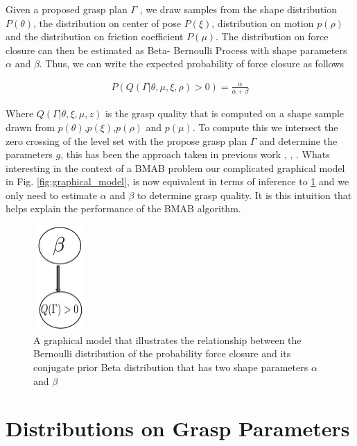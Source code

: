 \documentclass[letterpaper, 10 pt, conference]{ieeeconf}  %
\begin{document}
Given a proposed grasp plan $\Gamma$ , we draw samples from the shape distribution $P (\theta )$, the distribution on center of pose $P (\xi)$, distribution on motion $p(\rho)$ and the distribution on friction coefficient $P (\mu)$. The distribution on force closure can then be estimated as Beta- Bernoulli Process with shape parameters $\alpha$ and $\beta$. Thus, we can write the expected probability of force closure as follows


\vspace{-2ex}
\begin{align}\label{eq:shape_sampling}
P(Q(\Gamma|\theta,\mu,\xi,\rho) > 0) = \frac{\alpha}{\alpha + \beta}
\end{align}

Where $Q(\Gamma|\theta,\xi,\mu,z)$ is the grasp quality that is computed on a shape sample drawn from $p(\theta)$,$p(\xi)$,$p(\rho)$ and $p(\mu)$. To compute this we intersect the zero crossing of the level set with the propose grasp plan $\Gamma$ and determine the parameters $g$, this has been the approach taken in previous work  \cite{kehoe2012estimating}, \cite{kehoe2012toward},  \cite{christopoulos2007handling}. Whats interesting in the context of a BMAB problem our complicated graphical model in Fig. \ref{fig:graphical_model}, is now equivalent in terms of inference to \ref{fig:beta_model} and we only need to estimate $\alpha$ and $\beta$ to determine grasp quality. It is this intuition that helps explain the performance of the BMAB algorithm. 

\begin{figure}[ht!]
\centering
\includegraphics[width = 2cm, height = 4cm]{figures/Slide9.jpg}
\caption{A graphical model that illustrates the relationship between the Bernoulli distribution of the probability force closure and its conjugate prior Beta distribution that has two shape parameters $\alpha$ and $\beta$ }
\vspace*{-10pt}
\label{fig:beta_model}
\end{figure}




\section{Distributions on Grasp Parameters}
\label{sec:distgrasp}
 
\end{document}
